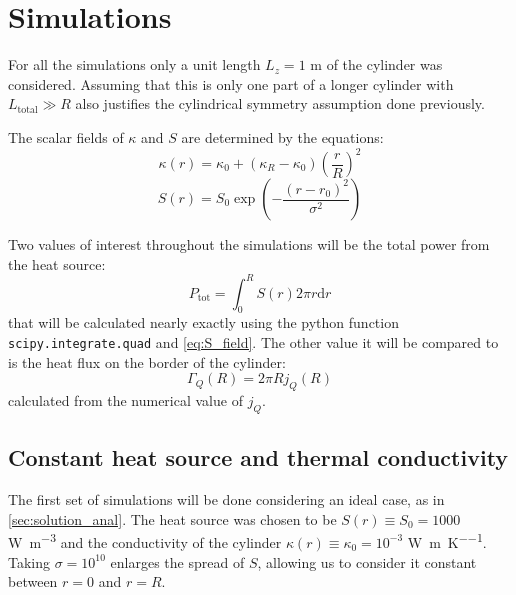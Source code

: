 \section{Simulations}

For all the simulations only a unit length $L_z = 1$ \si{\meter} of the cylinder was considered. Assuming that this is only one part of a longer cylinder with $L_\mathrm{total} \gg R$ also justifies the cylindrical symmetry assumption done previously.

The scalar fields of $\kappa$ and $S$ are determined by the equations:
\begin{equation}
    \kappa(r) = \kappa_0 + (\kappa_R - \kappa_0)\left(\frac{r}{R}\right)^2
    \label{eq:kappa_field}
\end{equation}
\begin{equation}
    S(r) = S_0\exp\left(-\frac{(r-r_0)^2}{\sigma^2}\right)
    \label{eq:S_field}
\end{equation}

Two values of interest throughout the simulations will be the total power from the heat source:
\begin{equation}
    P_\mathrm{tot} = \int_0^R S(r)2\pi r \mathrm{d}r
    \label{eq:ptot_source}
\end{equation}
that will be calculated nearly exactly using the python function \texttt{scipy.integrate.quad} and \autoref{eq:S_field}. The other value it will be compared to is the heat flux on the border of the cylinder:
\begin{equation}
    \Gamma_Q(R) = 2\pi Rj_Q(R)
    \label{eq:flux_border}
\end{equation}
calculated from the numerical value of $j_Q$.

\subsection{Constant heat source and thermal conductivity}
\label{sec:simu_constant}

The first set of simulations will be done considering an ideal case, as in \autoref{sec:solution_anal}. The heat source was chosen to be \(S(r) \equiv S_0 = 1000\) \si{\watt\per\cubic\meter} and the conductivity of the cylinder \(\kappa(r) \equiv \kappa_0 = 10^{-3}\) \si{\watt\per\meter\per\kelvin}. Taking \(\sigma = 10^{10}\) enlarges the spread of \(S\), allowing us to consider it constant between \(r=0\) and \(r=R\).

